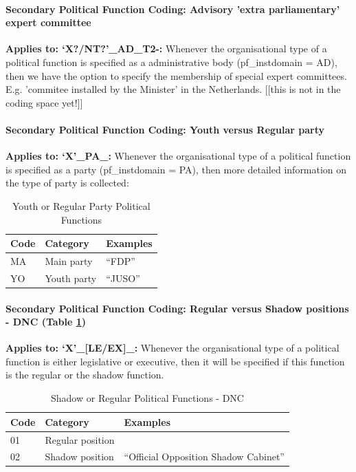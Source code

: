 \documentclass{article}
\begin{document}
\paragraph{Secondary Political Function Coding: Advisory 'extra parliamentary' expert committee }

\textbf{Applies to: `X?/NT?'\_AD\_T2-:} Whenever the organisational type of a political function is specified as a administrative body (pf\_instdomain = AD), then we have the option to specify the membership of special expert committees. E.g. 'commitee installed by the Minister' in the Netherlands. [[this is not in the coding space yet!]]

\paragraph{Secondary Political Function Coding: Youth versus Regular party}

\textbf{Applies to: `X'\_PA\_:} Whenever the organisational type of a political function is specified as a party (pf\_instdomain = PA), then more detailed information on the type of party is collected:
    \begin{table}[H]
    \begin{center}
         \begin{tabular}{|l|l|l|}
        Code & Category &  Examples \\
        \hline
        MA   & Main party & ``FDP” \\
        YO   & Youth party & ``JUSO” \\
        \hline
        \end{tabular}\caption{Youth or Regular Party Political Functions}
    \end{center}
    \end{table}


\paragraph{Secondary Political Function Coding: Regular versus Shadow positions - DNC (Table \ref{lab-shadow})}

\textbf{Applies to: `X'\_[LE/EX]\_:} Whenever the organisational type of a political function is either legislative or executive, then it will be specified if this function is the regular or the shadow function.

\begin{table}[H]
    \begin{center}
         \begin{tabular}{|l|l|l|}
        Code & Category &  Examples \\
        \hline
        01   & Regular position &  \\
        02   & Shadow position &  ``Official Opposition Shadow Cabinet''  \\    
        \hline
        \end{tabular}\caption{Shadow or Regular Political Functions - DNC }\label{lab-shadow}
    \end{center}
\end{table}
    
\end{document}

